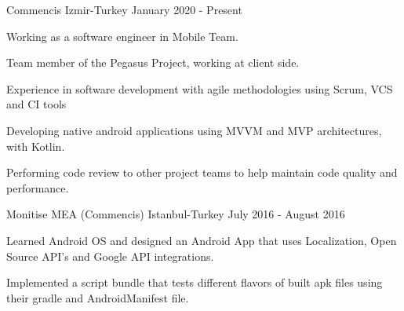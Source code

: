 

\begin{cventries}
{Commencis}
{Izmir-Turkey}
{January 2020 - Present }
{
  \begin{cvitems}
    \item {Working as a software engineer in Mobile Team.}
    \item {Team member of the Pegasus Project, working at client side. }
    \item {Experience in software development with agile methodologies using Scrum, VCS and CI tools }
    \item {Developing native android applications using MVVM and MVP architectures, with Kotlin.}
    \item {Performing code review to other project teams to help maintain code quality and performance.}
  \end{cvitems}
}
{Monitise MEA (Commencis)}
{Istanbul-Turkey}
{July 2016 - August 2016 }
{
  \begin{cvitems}
    \item {Learned Android OS and designed an Android App that uses Localization, Open Source API's and Google API integrations.}
    \item {Implemented a script bundle that tests different flavors of built apk files using their gradle and AndroidManifest file.}
  \end{cvitems}
}

\end{cventries}
